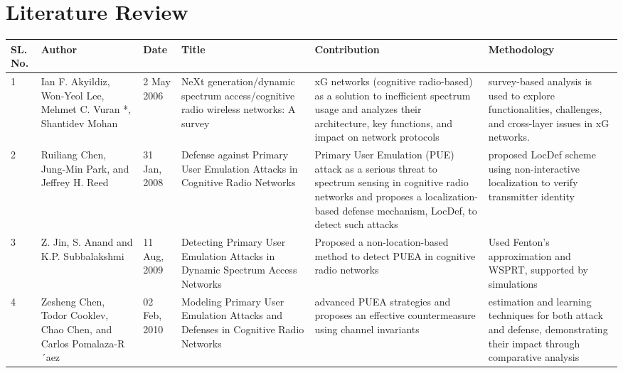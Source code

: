 \chapter{Literature Review}
\label{Chapter3}


\begin{table}[]
    \centering
\begin{tabular}{|p{0.5cm}|p{2.5cm}|p{1.0cm}|p{3.2cm}|p{2.9cm}|p{2.8cm}|}
\hline
\textbf{SL. No.} & \textbf{Author} & \textbf{Date} & \textbf{Title} & \textbf{Contribution} & \textbf{Methodology} \\

\hline
1 & Ian F. Akyildiz, Won-Yeol Lee, Mehmet C. Vuran *, Shantidev Mohan & 2 May 2006 & NeXt generation/dynamic spectrum access/cognitive
radio wireless networks: A survey & xG networks (cognitive radio-based) as a solution to inefficient spectrum usage and analyzes their architecture, key functions, and impact on network protocols & survey-based analysis is used to explore functionalities, challenges, and cross-layer issues in xG networks.\\
\hline
2 & Ruiliang Chen, Jung-Min Park, and Jeffrey H. Reed & 31 Jan, 2008 & Defense against Primary User Emulation Attacks in
Cognitive Radio Networks & Primary User Emulation (PUE) attack as a serious threat to spectrum sensing in cognitive radio networks and proposes a localization-based defense mechanism, LocDef, to detect such attacks & proposed LocDef scheme using non-interactive localization to verify transmitter identity \\
\hline
3 & Z. Jin, S. Anand and K.P. Subbalakshmi & 11 Aug, 2009 & Detecting Primary User Emulation Attacks in Dynamic Spectrum Access Networks & Proposed a non-location-based method to detect PUEA in cognitive radio networks & Used Fenton’s approximation and WSPRT, supported by simulations\\
\hline
4 & Zesheng Chen, Todor Cooklev, Chao Chen, and Carlos Pomalaza-R´aez & 02 Feb, 2010 & Modeling Primary User Emulation Attacks and
Defenses in Cognitive Radio Networks & advanced PUEA strategies and proposes an effective countermeasure using channel invariants & estimation and learning techniques for both attack and defense, demonstrating their impact through comparative analysis\\


\end{tabular}
\end{table}
